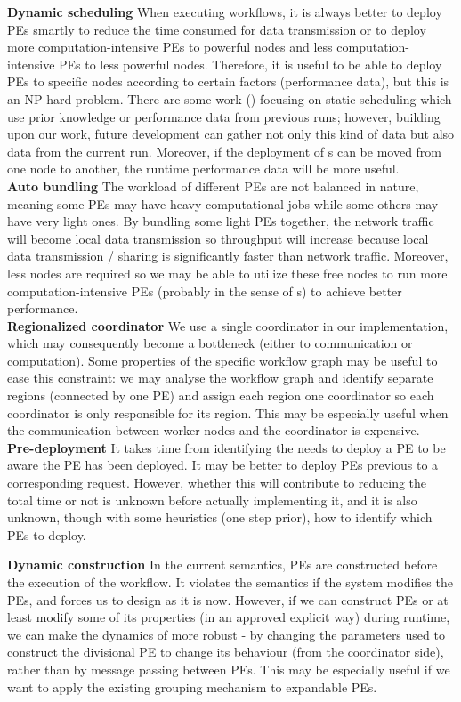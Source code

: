 \textbf{Dynamic scheduling}\quad
When executing workflows, it is always better to deploy PEs smartly to reduce the time consumed for data transmission or to deploy more computation-intensive PEs to powerful nodes and less computation-intensive PEs to less powerful nodes. Therefore, it is useful to be able to deploy PEs to specific nodes according to certain factors (\eg performance data), but this is an NP-hard problem. There are some work (\eg \cite{teylo2017hybrid}) focusing on static scheduling which use prior knowledge or performance data from previous runs; however, building upon our work, future development can gather not only this kind of data but also data from the current run. Moreover, if the deployment of \tPEInst{}s can be moved from one node to another, the runtime performance data will be more useful. \\

\textbf{Auto bundling}\quad
The workload of different PEs are not balanced in nature, meaning some PEs may have heavy computational jobs while some others may have very light ones. By bundling some light PEs together, the network traffic will become local data transmission so throughput will increase because local data transmission / sharing is significantly faster than network traffic. Moreover, less nodes are required so we may be able to utilize these free nodes to run more computation-intensive PEs (probably in the sense of \tPEDup{}s) to achieve better performance. \\

\textbf{Regionalized coordinator}\quad
We use a single coordinator in our implementation, which may consequently become a bottleneck (either to communication or computation). Some properties of the specific workflow graph may be useful to ease this constraint: we may analyse the workflow graph and identify separate regions (\eg connected by one PE) and assign each region one coordinator so each coordinator is only responsible for its region. This may be especially useful when the communication between worker nodes and the coordinator is expensive. \\

\textbf{Pre-deployment}\quad
It takes time from identifying the needs to deploy a PE to be aware the PE has been deployed. It may be better to deploy PEs previous to a corresponding request. However, whether this will contribute to reducing the total time or not is unknown before actually implementing it, and it is also unknown, though with some heuristics (\eg one step prior), how to identify which PEs to deploy.

\textbf{Dynamic construction}\quad
In the current \dpy semantics, PEs are constructed before the execution of the workflow. It violates the semantics if the system modifies the PEs, and forces us to design \tdynexp as it is now. However, if we can construct PEs or at least modify some of its properties (in an approved explicit way) during runtime, we can make the dynamics of \tdynexp more robust - by changing the parameters used to construct the divisional PE to change its behaviour (from the coordinator side), rather than by message passing between PEs. This may be especially useful if we want to apply the existing grouping mechanism to expandable PEs.
